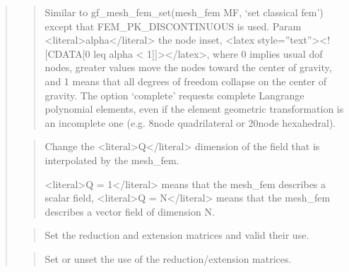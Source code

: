 \documentclass[a4paper,11pt,english]{sphinxmanual}
\begin{document}
\begin{quote}
\begin{quote}
\sphinxAtStartPar
Similar to gf\_mesh\_fem\_set(mesh\_fem MF, ‘set classical fem’) except that
FEM\_PK\_DISCONTINUOUS is used. Param \textless{}literal\textgreater{}alpha\textless{}/literal\textgreater{} the node inset,
\textless{}latex style=”text”\textgreater{}\textless{}!{[}CDATA{[}0 leq alpha \textless{} 1{]}{]}\textgreater{}\textless{}/latex\textgreater{}, where 0 implies usual dof nodes, greater values
move the nodes toward the center of gravity, and 1 means that all
degrees of freedom collapse on the center of gravity.
The option ‘complete’ requests complete Langrange polynomial elements,
even if the element geometric transformation is an incomplete one
(e.g. 8\sphinxhyphen{}node quadrilateral or 20\sphinxhyphen{}node hexahedral).
\end{quote}

\sphinxAtStartPar
{}
\begin{quote}

\sphinxAtStartPar
Change the \textless{}literal\textgreater{}Q\textless{}/literal\textgreater{} dimension of the field that is interpolated by the mesh\_fem.

\sphinxAtStartPar
\textless{}literal\textgreater{}Q = 1\textless{}/literal\textgreater{} means that the mesh\_fem describes a scalar field, \textless{}literal\textgreater{}Q = N\textless{}/literal\textgreater{} means
that the mesh\_fem describes a vector field of dimension N.
\end{quote}

\sphinxAtStartPar
{}
\begin{quote}

\sphinxAtStartPar
Set the reduction and extension matrices and valid their use.
\end{quote}

\sphinxAtStartPar
{}
\begin{quote}

\sphinxAtStartPar
Set or unset the use of the reduction/extension matrices.
\end{quote}

\sphinxAtStartPar
{}
\begin{quote}


\end{quote}
\end{quote}
\end{document}
